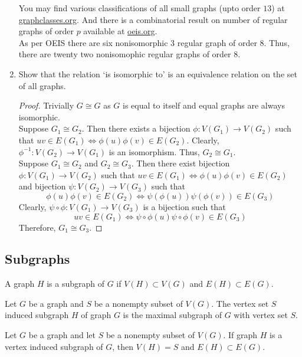 \begin{enumerate}
\begin{commentary}
	You may find various classifications of all small graphs (upto order $13$) at \href{https://www.graphclasses.org/smallgraphs.html}{graphclasses.org}. And there is a combinatorial result on number of regular graphs of order $p$ available at \href{https://oeis.org/A051031}{oeis.org}.\\

	As per OEIS there are six nonisomorphic $3$ regular graph of order $8$. Thus, there are twenty two nonisomophic regular graphs of order $8$.
\end{commentary}
	\setcounter{enumi}{8}
	\item Show that the relation `is isomorphic to' is an equivalence relation on the set of all graphs.
	\begin{proof}
		Trivially $G \cong G$ as $G$ is equal to itself and equal graphs are always isomorphic.\\

		Suppose $G_1 \cong G_2$. Then there exists a bijection $\phi : V(G_1) \to V(G_2)$ such that $uv \in E(G_1) \iff \phi(u)\phi(v) \in E(G_2)$. Clearly, $\phi^{-1} : V(G_2) \to V(G_1)$ is an isomorphism. Thus, $G_2 \cong G_1$.\\

		Suppose $G_1 \cong G_2$ and $G_2 \cong G_3$.
		Then there exist bijection $\phi : V(G_1) \to V(G_2)$ such that $uv \in E(G_1) \iff \phi(u)\phi(v) \in E(G_2)$ and bijection $\psi : V(G_2) \to V(G_3)$ such that
		$$\phi(u)\phi(v) \in E(G_2) \iff \psi(\phi(u))\psi(\phi(v)) \in E(G_3)$$
		Clearly, $\psi \circ \phi : V(G_1) \to V(G_3)$ is a bijection such that
		$$ uv \in E(G_1) \iff \psi \circ \phi(u) \psi\circ\phi(v) \in E(G_3) $$
		Therefore, $G_1 \cong G_3$.
	\end{proof}
\end{enumerate}

\subsection{Subgraphs}
\begin{definition}
	A graph $H$ is a subgraph of $G$ if $V(H) \subset V(G)$ and $E(H) \subset E(G)$.
\end{definition}

\begin{definition}
	Let $G$ be a graph and $S$ be a nonempty subset of $V(G)$.
	The vertex set $S$ induced subgraph $H$ of graph $G$ is the maximal subgraph of $G$ with vertex set $S$.
\end{definition}
\begin{remark}
	Let $G$ be a graph and let $S$ be a nonempty subset of $V(G)$.
	If graph $H$ is a vertex induced subgraph of $G$, then $V(H) = S$ and $E(H) \subset E(G)$.
\end{remark}

